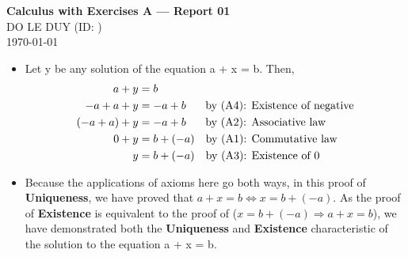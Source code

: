 
\newcommand{\myclass}{Calculus with Exercises A}
\newcommand{\myname}{DO LE DUY}
\newcommand{\myhwtype}{Report 01}
\newcommand{\mystudentid}{}
\newcommand{\questiontype}{Problem}
\newcommand{\writtensection}{1}


\newenvironment{alphaparts}[0]{%
  \begin{enumerate}[label=\textbf{(\alph*)}]
}{\end{enumerate}}

\newenvironment{arabicparts}[0]{%
  \begin{enumerate}[label=\textbf{\arabic{questionCounter}.\arabic*})]
}{\end{enumerate}}

\newenvironment{questionpart}[0]{%
  \item
}{}



\thispagestyle{plain}
\begin{center}
  {\Large \textbf{\myclass{} — \myhwtype{} }}\\
  \vspace{0.6em} {\myname{} (\small{ID: \mystudentid{}})}\\
  \today
\end{center}


\begin{numedquestion}
 \begin{itemize}
  \item Let y be any solution of the equation a + x = b. Then,
    \begin{align*}
    a + y & = b \\ 
    -a + a + y     & = -a + b   \quad \hspace{0.75em} \text{by (A4): Existence of negative}\\
    (-a + a) + y     & = -a + b \quad \hspace{0.75em} \text{by (A2): Associative law}\\
    0 + y     & = b + (-a)      \quad \text{by (A1): Commutative law}\\
    y &= b +  (-a)              \quad \text{by (A3): Existence of 0}
    \end{align*} 
  \item Because the applications of axioms here go both ways, in this proof of \textbf{Uniqueness}, we have proved that \(a + x = b \iff x = b +  (-a)\). As the proof of \textbf{Existence} is equivalent to the proof of (\(x = b +  (-a) \Rightarrow a + x = b\)), we have demonstrated both the \textbf{Uniqueness} and \textbf{Existence} characteristic of the solution to the equation a + x = b. 
 \end{itemize}
\end{numedquestion}




